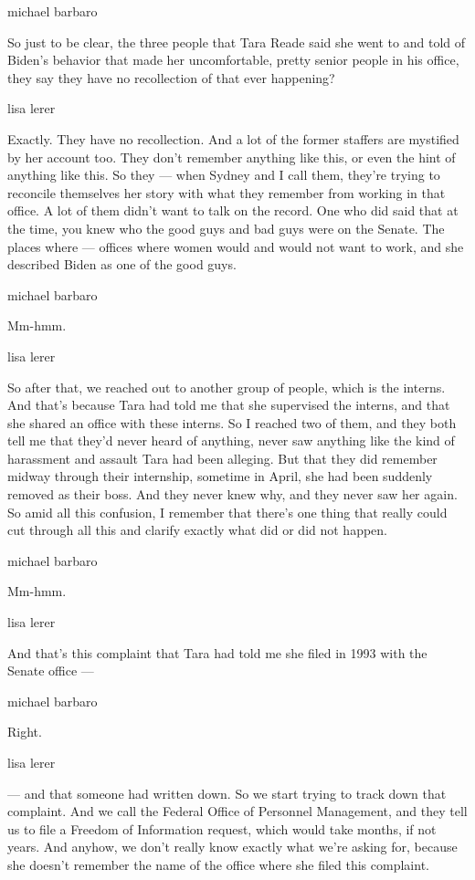 michael barbaro

So just to be clear, the three people that Tara Reade said she went to
and told of Biden's behavior that made her uncomfortable, pretty senior
people in his office, they say they have no recollection of that ever
happening?

lisa lerer

Exactly. They have no recollection. And a lot of the former staffers are
mystified by her account too. They don't remember anything like this, or
even the hint of anything like this. So they --- when Sydney and I call
them, they're trying to reconcile themselves her story with what they
remember from working in that office. A lot of them didn't want to talk
on the record. One who did said that at the time, you knew who the good
guys and bad guys were on the Senate. The places where --- offices where
women would and would not want to work, and she described Biden as one
of the good guys.

michael barbaro

Mm-hmm.

lisa lerer

So after that, we reached out to another group of people, which is the
interns. And that's because Tara had told me that she supervised the
interns, and that she shared an office with these interns. So I reached
two of them, and they both tell me that they'd never heard of anything,
never saw anything like the kind of harassment and assault Tara had been
alleging. But that they did remember midway through their internship,
sometime in April, she had been suddenly removed as their boss. And they
never knew why, and they never saw her again. So amid all this
confusion, I remember that there's one thing that really could cut
through all this and clarify exactly what did or did not happen.

michael barbaro

Mm-hmm.

lisa lerer

And that's this complaint that Tara had told me she filed in 1993 with
the Senate office ---

michael barbaro

Right.

lisa lerer

--- and that someone had written down. So we start trying to track down
that complaint. And we call the Federal Office of Personnel Management,
and they tell us to file a Freedom of Information request, which would
take months, if not years. And anyhow, we don't really know exactly what
we're asking for, because she doesn't remember the name of the office
where she filed this complaint.

